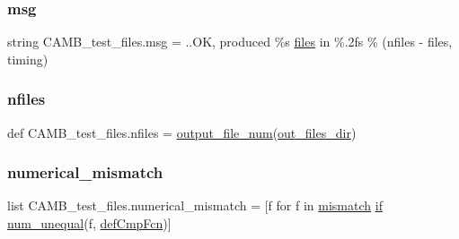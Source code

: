 \subsubsection{\texorpdfstring{msg}{msg}}
{\footnotesize\ttfamily string C\+A\+M\+B\+\_\+test\+\_\+files.\+msg = \textquotesingle{}..OK, produced \%s \mbox{\hyperlink{namespaceCAMB__test__files_a830af4ed561145655ecc4f63423fd5b1}{files}} in \%.\+2fs\textquotesingle{} \% (nfiles -\/ files, timing)}

\mbox{\label{namespaceCAMB__test__files_a168a759276e1aab6fe52615feb2e324a}} 
\subsubsection{\texorpdfstring{nfiles}{nfiles}}
{\footnotesize\ttfamily def C\+A\+M\+B\+\_\+test\+\_\+files.\+nfiles = \mbox{\hyperlink{namespaceCAMB__test__files_a2aa5d4f5677cf5a78388238c4dc45b7d}{output\+\_\+file\+\_\+num}}(\mbox{\hyperlink{namespaceCAMB__test__files_aab425eab53a3ec49aec1a01880b7bad7}{out\+\_\+files\+\_\+dir}})}

\mbox{\label{namespaceCAMB__test__files_afe3806691a62f8356f9366cf3e506351}} 
\subsubsection{\texorpdfstring{numerical\+\_\+mismatch}{numerical\_mismatch}}
{\footnotesize\ttfamily list C\+A\+M\+B\+\_\+test\+\_\+files.\+numerical\+\_\+mismatch = \mbox{[}f for f in \mbox{\hyperlink{namespaceCAMB__test__files_aa80ce7293e95f2cb3e4e1ad2b0d424fa}{mismatch}} \mbox{\hyperlink{plotTT_8m_a722e57dd98d67aec0b3589ce8efff8bb}{if}} \mbox{\hyperlink{namespaceCAMB__test__files_a79f9b0e8484d9f397e2dc4addc178620}{num\+\_\+unequal}}(f, \mbox{\hyperlink{namespaceCAMB__test__files_aa74109e69e8ed8e8a518bb379902a1a0}{def\+Cmp\+Fcn}})\mbox{]}}

\mbox{\label{namespaceCAMB__test__files_aab425eab53a3ec49aec1a01880b7bad7}} 
